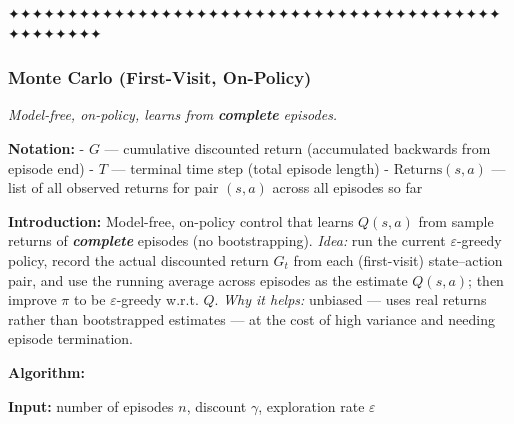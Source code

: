 \documentclass[11pt]{article}
\begin{document}
    ✦✦✦✦✦✦✦✦✦✦✦✦✦✦✦✦✦✦✦✦✦✦✦✦✦✦✦✦✦✦✦✦✦✦✦✦✦✦✦✦✦✦✦✦✦✦✦✦✦✦

    \clearpage

\label{monte-carlo-first-visit}

    \subsubsection{Monte Carlo (First-Visit,
On-Policy)}\label{monte-carlo-first-visit-on-policy}

    \emph{Model-free, on-policy, learns from} \textbf{\emph{complete}}
\emph{episodes.}

    \textbf{Notation:} - \(G\) --- cumulative discounted return (accumulated
backwards from episode end) - \(T\) --- terminal time step (total
episode length) - \(\text{Returns}(s,a)\) --- list of all observed
returns for pair \((s,a)\) across all episodes so far

    \label{intro-2-1}

    \textbf{Introduction:} Model-free, on-policy control that learns
\(Q(s,a)\) from sample returns of \textbf{\emph{complete}} episodes (no
bootstrapping). \emph{Idea:} run the current \(\varepsilon\)-greedy
policy, record the actual discounted return \(G_t\) from each
(first-visit) state--action pair, and use the running average across
episodes as the estimate \(Q(s,a)\); then improve \(\pi\) to be
\(\varepsilon\)-greedy w.r.t. \(Q\). \emph{Why it helps:} unbiased ---
uses real returns rather than bootstrapped estimates --- at the cost of
high variance and needing episode termination.

    \textbf{Algorithm:}

\textbf{Input:} number of episodes \(n\), discount \(\gamma\),
exploration rate \(\varepsilon\)
\end{document}
